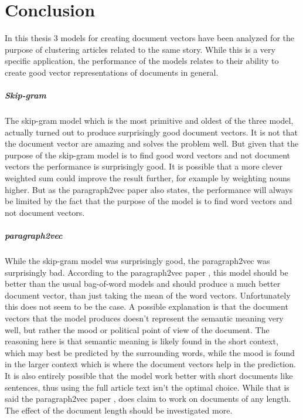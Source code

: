 \chapter{Conclusion}

In this thesis 3 models for creating document vectors have been analyzed for the purpose of clustering articles related to the same story. While this is a very specific application, the performance of the models relates to their ability to create good vector representations of documents in general.

\paragraph{Skip-gram} The skip-gram model which is the most primitive and oldest of the three model, actually turned out to produce surprisingly good document vectors. It is not that the document vector are amazing and solves the problem well. But given that the purpose of the skip-gram model is to find good word vectors and not document vectors the performance is surprisingly good. It is possible that a more clever weighted sum could improve the result further, for example by weighting nouns higher. But as the paragraph2vec paper \cite{doc2vec} also states, the performance will always be limited by the fact that the purpose of the model is to find word vectors and not document vectors.

\paragraph{paragraph2vec} While the skip-gram model was surprisingly good, the paragraph2\-vec was surprisingly bad. According to the paragraph2vec paper \cite{doc2vec}, this model should be better than the usual bag-of-word models and should produce a much better document vector, than just taking the mean of the word vectors. Unfortunately this does not seem to be the case. A possible explanation is that the document vectors that the model produces doesn't represent the semantic meaning very well, but rather the mood or political point of view of the document. The reasoning here is that semantic meaning is likely found in the short context, which may best be predicted by the surrounding words, while the mood is found in the larger context which is where the document vectors help in the prediction. It is also entirely possible that the model work better with short documents like sentences, thus using the full article text isn't the optimal choice. While that is said the paragraph2vec paper \cite{doc2vec}, does claim to work on documents of any length. The effect of the document length should be investigated more.

